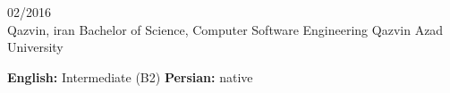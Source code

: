 \documentclass[8pt]{developercv} %
\begin{document}
    \vspace{-10 pt}
    \begin{entrylist}
        \entry
        {02/2016 \\ Qazvin, iran}
        {Bachelor of Science, Computer Software Engineering}
        {Qazvin Azad University}
        { }
    \end{entrylist}

    \vspace{-10 pt}
    \vspace{-6pt}

    \hspace{26mm} \textbf{English:} Intermediate (B2) \slashsep \textbf{Persian:} native

\end{document}
